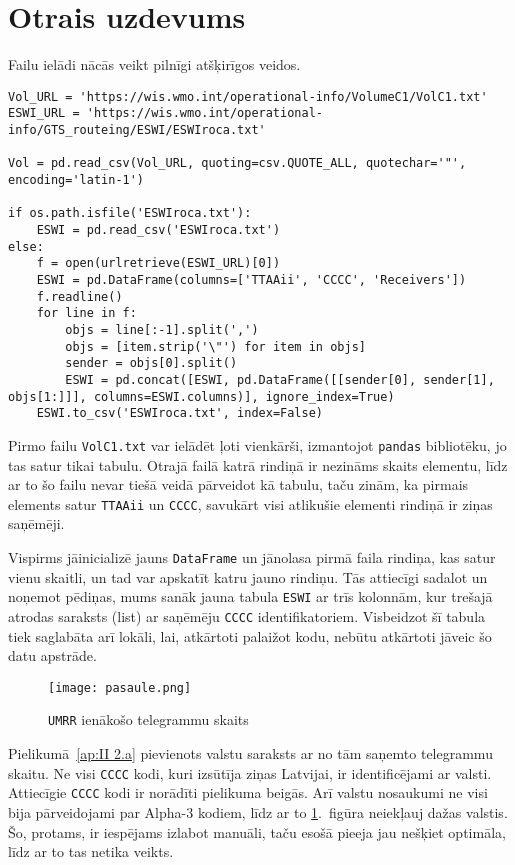 \documentclass[12pt,a4paper]{article}
\begin{document}
\section*{Otrais uzdevums}
Failu ielādi nācās veikt pilnīgi atšķirīgos veidos.

\begin{lstlisting}[breaklines]
Vol_URL = 'https://wis.wmo.int/operational-info/VolumeC1/VolC1.txt'
ESWI_URL = 'https://wis.wmo.int/operational-info/GTS_routeing/ESWI/ESWIroca.txt'

Vol = pd.read_csv(Vol_URL, quoting=csv.QUOTE_ALL, quotechar='"', encoding='latin-1')

if os.path.isfile('ESWIroca.txt'):
    ESWI = pd.read_csv('ESWIroca.txt')
else:
    f = open(urlretrieve(ESWI_URL)[0])
    ESWI = pd.DataFrame(columns=['TTAAii', 'CCCC', 'Receivers'])
    f.readline()
    for line in f:
        objs = line[:-1].split(',')
        objs = [item.strip('\"') for item in objs]
        sender = objs[0].split()
        ESWI = pd.concat([ESWI, pd.DataFrame([[sender[0], sender[1], objs[1:]]], columns=ESWI.columns)], ignore_index=True)
    ESWI.to_csv('ESWIroca.txt', index=False)
\end{lstlisting}
Pirmo failu \texttt{VolC1.txt} var ielādēt ļoti vienkārši, izmantojot \texttt{pandas} bibliotēku, jo tas satur tikai tabulu. Otrajā failā katrā rindiņā ir nezināms skaits elementu, līdz ar to šo failu nevar tiešā veidā pārveidot kā tabulu, taču zinām, ka pirmais elements satur \texttt{TTAAii} un \texttt{CCCC}, savukārt visi atlikušie elementi rindiņā ir ziņas saņēmēji.

Vispirms jāinicializē jauns \texttt{DataFrame} un jānolasa pirmā faila rindiņa, kas satur vienu skaitli, un tad var apskatīt katru jauno rindiņu.
Tās attiecīgi sadalot un noņemot pēdiņas, mums sanāk jauna tabula \texttt{ESWI} ar trīs kolonnām, kur trešajā atrodas saraksts (list) ar saņēmēju \texttt{CCCC} identifikatoriem.
Visbeidzot šī tabula tiek saglabāta arī lokāli, lai, atkārtoti palaižot kodu, nebūtu atkārtoti jāveic šo datu apstrāde.

\begin{figure}[ht!]
    \centering
    \texttt{[image: pasaule.png]}
    \caption{\texttt{UMRR} ienākošo telegrammu skaits}\label{pasaule}
\end{figure}

Pielikumā~\ref{ap:II 2.a} pievienots valstu saraksts ar no tām saņemto telegrammu skaitu.
Ne visi \texttt{CCCC} kodi, kuri izsūtīja ziņas Latvijai, ir identificējami ar valsti. Attiecīgie \texttt{CCCC} kodi 
ir norādīti pielikuma beigās. Arī valstu nosaukumi ne visi bija pārveidojami par Alpha-3 kodiem, līdz ar to \ref{pasaule}.~figūra neiekļauj dažas valstis. Šo, protams, ir iespējams izlabot manuāli, taču esošā pieeja jau nešķiet optimāla, līdz ar to tas netika veikts.
\end{document}
